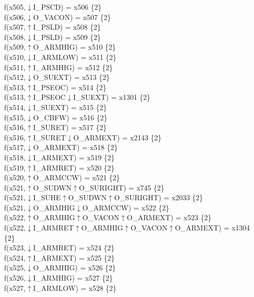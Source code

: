f(x505,$\downarrow$I\_PSCD) = x506 \{2\} \\  
f(x506,$\downarrow$O\_VACON) = x507 \{2\} \\  
f(x507,$\uparrow$I\_PSLD) = x508 \{2\} \\  
f(x508,$\downarrow$I\_PSLD) = x509 \{2\} \\  
f(x509,$\uparrow$O\_ARMHIG) = x510 \{2\} \\  
f(x510,$\downarrow$I\_ARMLOW) = x511 \{2\} \\  
f(x511,$\uparrow$I\_ARMHIG) = x512 \{2\} \\  
f(x512,$\downarrow$O\_SUEXT) = x513 \{2\} \\  
f(x513,$\uparrow$I\_PSEOC) = x514 \{2\} \\  
f(x513,$\uparrow$I\_PSEOC$\downarrow$I\_SUEXT) = x1301 \{2\} \\  
f(x514,$\downarrow$I\_SUEXT) = x515 \{2\} \\  
f(x515,$\downarrow$O\_CBFW) = x516 \{2\} \\  
f(x516,$\uparrow$I\_SURET) = x517 \{2\} \\  
f(x516,$\uparrow$I\_SURET$\downarrow$O\_ARMEXT) = x2143 \{2\} \\  
f(x517,$\downarrow$O\_ARMEXT) = x518 \{2\} \\  
f(x518,$\downarrow$I\_ARMEXT) = x519 \{2\} \\  
f(x519,$\uparrow$I\_ARMRET) = x520 \{2\} \\  
f(x520,$\uparrow$O\_ARMCCW) = x521 \{2\} \\  
f(x521,$\uparrow$O\_SUDWN$\uparrow$O\_SURIGHT) = x745 \{2\} \\  
f(x521,$\downarrow$I\_SUHE$\uparrow$O\_SUDWN$\uparrow$O\_SURIGHT) = x2033 \{2\} \\  
f(x521,$\downarrow$O\_ARMHIG$\downarrow$O\_ARMCCW) = x522 \{2\} \\  
f(x522,$\uparrow$O\_ARMHIG$\uparrow$O\_VACON$\uparrow$O\_ARMEXT) = x523 \{2\} \\  
f(x522,$\downarrow$I\_ARMRET$\uparrow$O\_ARMHIG$\uparrow$O\_VACON$\uparrow$O\_ARMEXT) = x1304 \{2\} \\  
f(x523,$\downarrow$I\_ARMRET) = x524 \{2\} \\  
f(x524,$\uparrow$I\_ARMEXT) = x525 \{2\} \\  
f(x525,$\downarrow$O\_ARMHIG) = x526 \{2\} \\  
f(x526,$\downarrow$I\_ARMHIG) = x527 \{2\} \\  
f(x527,$\uparrow$I\_ARMLOW) = x528 \{2\} \\  

